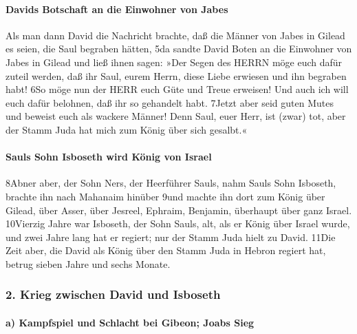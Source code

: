 \hypertarget{davids-botschaft-an-die-einwohner-von-jabes}{%
\paragraph{Davids Botschaft an die Einwohner von
Jabes}\label{davids-botschaft-an-die-einwohner-von-jabes}}

Als man dann David die Nachricht brachte, daß die Männer von Jabes in
Gilead es seien, die Saul begraben hätten, 5da sandte David Boten an die
Einwohner von Jabes in Gilead und ließ ihnen sagen: »Der Segen des HERRN
möge euch dafür zuteil werden, daß ihr Saul, eurem Herrn, diese Liebe
erwiesen und ihn begraben habt! 6So möge nun der HERR euch Güte und
Treue erweisen! Und auch ich will euch dafür belohnen, daß ihr so
gehandelt habt. 7Jetzt aber seid guten Mutes und beweist euch als
wackere Männer! Denn Saul, euer Herr, ist (zwar) tot, aber der Stamm
Juda hat mich zum König über sich gesalbt.«

\hypertarget{sauls-sohn-isboseth-wird-kuxf6nig-von-israel}{%
\paragraph{Sauls Sohn Isboseth wird König von
Israel}\label{sauls-sohn-isboseth-wird-kuxf6nig-von-israel}}

8Abner aber, der Sohn Ners, der Heerführer Sauls, nahm Sauls Sohn
Isboseth, brachte ihn nach Mahanaim hinüber 9und machte ihn dort zum
König über Gilead, über Asser, über Jesreel, Ephraim, Benjamin,
überhaupt über ganz Israel. 10Vierzig Jahre war Isboseth, der Sohn
Sauls, alt, als er König über Israel wurde, und zwei Jahre lang hat er
regiert; nur der Stamm Juda hielt zu David. 11Die Zeit aber, die David
als König über den Stamm Juda in Hebron regiert hat, betrug sieben Jahre
und sechs Monate.

\hypertarget{krieg-zwischen-david-und-isboseth}{%
\subsubsection{2. Krieg zwischen David und
Isboseth}\label{krieg-zwischen-david-und-isboseth}}

\hypertarget{a-kampfspiel-und-schlacht-bei-gibeon-joabs-sieg}{%
\paragraph{a) Kampfspiel und Schlacht bei Gibeon; Joabs
Sieg}\label{a-kampfspiel-und-schlacht-bei-gibeon-joabs-sieg}}

